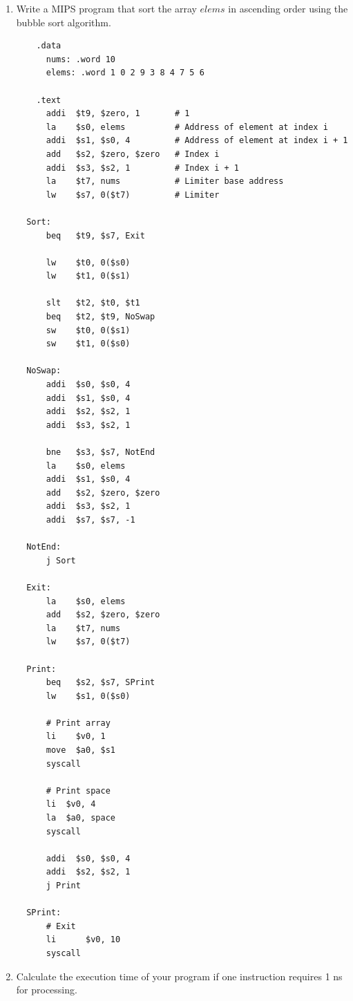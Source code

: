 \documentclass[12pt,a4paper]{article}
\begin{document}
\begin{enumerate}
  \item Write a MIPS program that sort the array \(elems\) in ascending order using the bubble sort algorithm.
        \begin{mdframed}[hidealllines=true,backgroundcolor=magenta!10]
          \begin{lstlisting}
    .data
      nums: .word 10
      elems: .word 1 0 2 9 3 8 4 7 5 6

    .text
      addi  $t9, $zero, 1       # 1
      la    $s0, elems          # Address of element at index i
      addi  $s1, $s0, 4         # Address of element at index i + 1
      add   $s2, $zero, $zero   # Index i
      addi  $s3, $s2, 1         # Index i + 1
      la    $t7, nums           # Limiter base address
      lw    $s7, 0($t7)         # Limiter

  Sort:
      beq   $t9, $s7, Exit

      lw    $t0, 0($s0)
      lw    $t1, 0($s1)

      slt   $t2, $t0, $t1
      beq   $t2, $t9, NoSwap
      sw    $t0, 0($s1)
      sw    $t1, 0($s0)

  NoSwap:
      addi  $s0, $s0, 4
      addi  $s1, $s0, 4
      addi  $s2, $s2, 1
      addi  $s3, $s2, 1

      bne   $s3, $s7, NotEnd
      la    $s0, elems
      addi  $s1, $s0, 4
      add   $s2, $zero, $zero
      addi  $s3, $s2, 1
      addi  $s7, $s7, -1

  NotEnd:
      j Sort

  Exit:
      la    $s0, elems
      add   $s2, $zero, $zero
      la    $t7, nums
      lw    $s7, 0($t7)

  Print:
      beq   $s2, $s7, SPrint
      lw    $s1, 0($s0)

      # Print array
      li    $v0, 1
      move  $a0, $s1
      syscall

      # Print space
      li  $v0, 4
      la  $a0, space
      syscall

      addi  $s0, $s0, 4
      addi  $s2, $s2, 1
      j Print

  SPrint:
      # Exit
      li      $v0, 10
      syscall
          \end{lstlisting}
        \end{mdframed}
  \item Calculate the execution time of your program if one instruction requires 1 ns for processing. \\


\end{enumerate}
\end{document}
